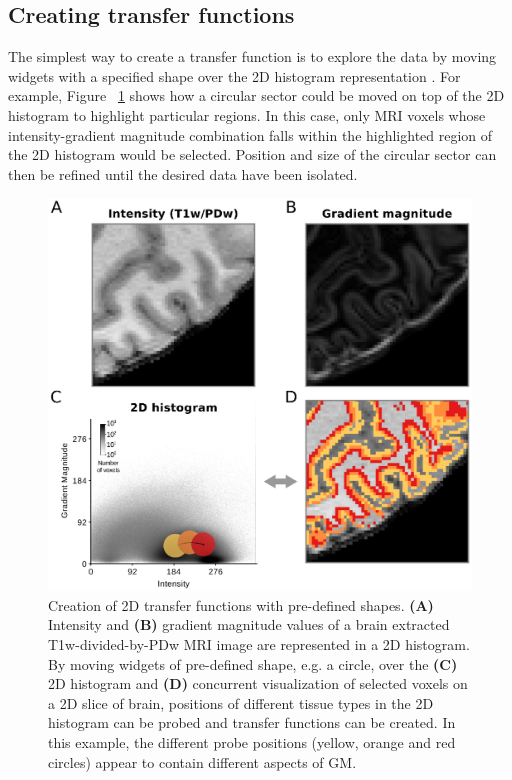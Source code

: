 \subsection{Creating transfer functions}
The simplest way to create a transfer function is to explore the data by moving widgets with a specified shape over the 2D histogram representation \parencite{Kniss2005}. For example, Figure ~\ref{fig:Fig2} shows how a circular sector could be moved on top of the 2D histogram to highlight particular regions. In this case, only MRI voxels whose intensity-gradient magnitude combination falls within the highlighted region of the 2D histogram would be selected. Position and size of the circular sector can then be refined until the desired data have been isolated.

\begin{figure}[htb!]
\centering
\includegraphics[width=\textwidth]{figures/chapter_02/figure_2.eps}
\caption{Creation of 2D transfer functions with pre-defined shapes. \textbf{(A)} Intensity and \textbf{(B)} gradient magnitude values of a brain extracted T1w-divided-by-PDw MRI image are represented in a 2D histogram. By moving widgets of pre-defined shape, e.g. a circle, over the \textbf{(C)} 2D histogram and \textbf{(D)} concurrent visualization of selected voxels on a 2D slice of brain, positions of different tissue types in the 2D histogram can be probed and transfer functions can be created. In this example, the different probe positions (yellow, orange and red circles) appear to contain different aspects of GM.}
\label{fig:Fig2}
\end{figure}

